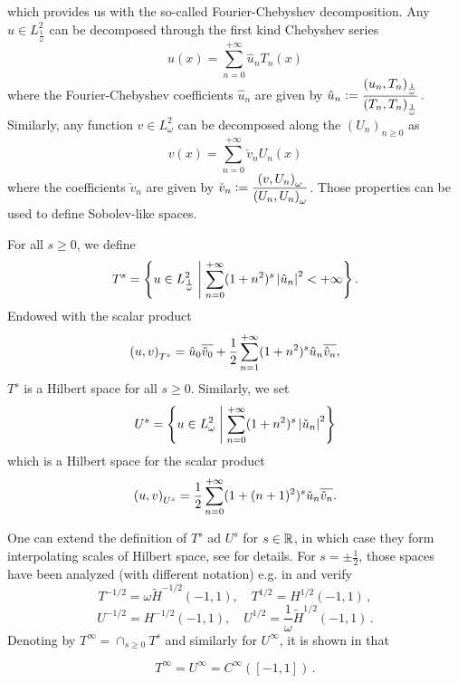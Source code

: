 \documentclass[a4paper]{article}
\begin{document}
which provides us with the so-called Fourier-Chebyshev decomposition. Any
$u\in L^2_{\frac{1}{\omega}}$ can be decomposed through the first kind Chebyshev series 
\begin{equation}
	u(x) = \sum_{n=0}^{+\infty} \hat{u}_n T_n(x)
	\label{FCseries}
\end{equation}
where the Fourier-Chebyshev coefficients $\hat{u}_n$ are given by $\hat{u}_n \mathrel{\mathop:}= \dfrac{\left( u_n,T_n\right)_\frac{1}{\omega}}{\left( T_n,T_n\right)_\frac{1}{\omega}}\,.$
Similarly, any 
function $v\in L^2_{\omega}$ can be decomposed along the $(U_n)_{n\geq 0}$ as
\[ v(x) = \sum_{n=0}^{+\infty} \check{v}_n U_n(x)\]
where the coefficients $\check{v}_n$ are given by $\check{v}_n \mathrel{\mathop:}= 
\dfrac{\left( v,U_n\right)_{\omega}}{\left( U_n,U_n\right)_\omega}$.
Those properties can be used to define Sobolev-like spaces. 
\begin{Def}
	For all $s \geq 0$, we define 
	\[T^s = \left\{ u \in L^2_\frac{1}{\omega}\mathrel{}\middle|\mathrel{} \sum_{n=0}^{+\infty}(1+n^2)^s \left\lvert \hat{u}_n \right\rvert^2 < + \infty\right\}.\]
	Endowed with the scalar product
	\[\left( u,v\right)_{T^s} = \hat{u}_0 \overline{\hat{v}_0} + \frac{1}{2}\sum_{n=1}^{+\infty}(1+n^2)^s\hat{u}_n \overline{\hat{v}_n},\]
	$T^s$ is a Hilbert space for all $s \geq 0$. 
	Similarly, we set
	\[U^s = \left\{u \in L^2_\omega\mathrel{}\middle|\mathrel{} \sum_{n=0}^{+\infty} (1 + n^2)^s\left\lvert \check{u}_n \right\rvert^2\right\}\]
	which is a Hilbert space for the scalar product
	\[\left( u,v\right)_{U^s} = \frac{1}{2} \sum_{n=0}^{+ \infty} (1 + (n+1)^2)^s\check{u}_n\overline{\check{v}_n}.\]
\end{Def}
One can extend the definition of $T^s$ ad $U^s$ for $s\in \mathbb{R}$, in which case they form interpolating scales of Hilbert space, see \cite{averseng} for details.  For $s = \pm \frac{1}{2}$, those spaces 
have been analyzed (with different notation) e.g. in \cite{jerez2012explicit} and verify
\begin{equation}
\label{lemJerez1}
T^{-1/2} = {\omega} \tilde{H}^{-1/2}(-1,1), \quad T^{1/2} = H^{1/2}(-1,1)\,,
\end{equation}
\begin{equation}
\label{lemJerez2}
U^{-1/2} = H^{-1/2}(-1,1), \quad U^{1/2} = \frac{1}{\omega }\tilde{H}^{1/2}(-1,1)\,.
\end{equation}
Denoting by $T^\infty = \cap_{s \geq 0} T^s$ and similarly for $U^\infty$, it is shown in \cite{averseng} that
\begin{Lem}
	\[T^{\infty} = U^{\infty} = C^{\infty}([-1,1])\,.\]
	\label{LemTinfCinf}
\end{Lem}
\end{document}
